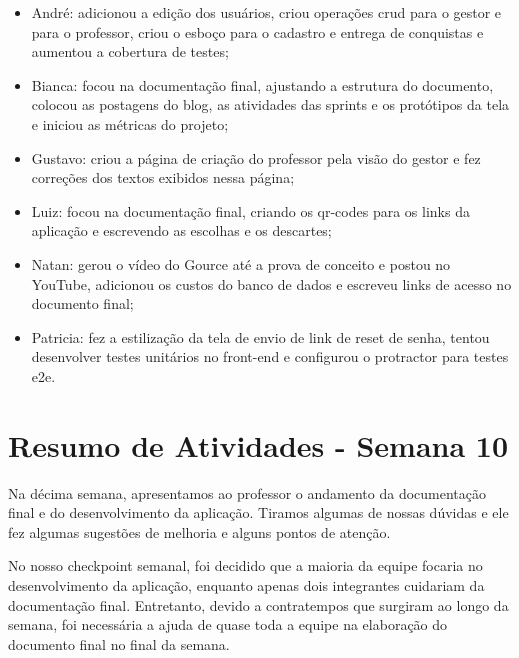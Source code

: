 \begin{apendicesenv}
\begin{itemize}
\item André: adicionou a edição dos usuários, criou operações \ac{crud} para o gestor e para o professor, criou o esboço para o cadastro e entrega de conquistas e aumentou a cobertura de testes;
\item Bianca: focou na documentação final, ajustando a estrutura do documento, colocou as postagens do blog, as atividades das \glspl{sprint} e os protótipos da tela e iniciou as métricas do projeto;
\item Gustavo: criou a página de criação do professor pela visão do gestor e fez correções dos textos exibidos nessa página;
\item Luiz: focou na documentação final, criando os \glspl{qr-code} para os links da aplicação e escrevendo as escolhas e os descartes;
\item Natan: gerou o vídeo do Gource até a prova de conceito e postou no YouTube, adicionou os custos do banco de dados e escreveu \glspl{link} de acesso no documento final;
\item Patricia: fez a estilização da tela de envio de \gls{link} de \gls{reset} de senha, tentou desenvolver testes unitários no front-end e configurou o protractor para testes e2e.
\end{itemize}

\section{Resumo de Atividades - Semana 10}
Na décima semana, apresentamos ao professor o andamento da documentação final e do desenvolvimento da aplicação. Tiramos algumas de nossas dúvidas e ele fez algumas sugestões de melhoria e alguns pontos de atenção.

No nosso checkpoint semanal, foi decidido que a maioria da equipe focaria no desenvolvimento da aplicação, enquanto apenas dois integrantes cuidariam da documentação final. Entretanto, devido a contratempos que surgiram ao longo da semana, foi necessária a ajuda de quase toda a equipe na elaboração do documento final no final da semana.


\end{apendicesenv}
